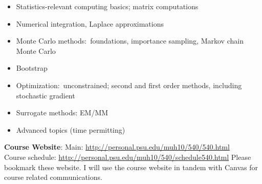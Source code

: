 \documentclass[10pt]{article}
\begin{document}
\begin{itemize}
\item Statistics-relevant computing basics; matrix computations
\item Numerical integration, Laplace approximations 
\item Monte Carlo methods:\ foundations, importance sampling, Markov
  chain Monte Carlo
\item Bootstrap
\item Optimization:\ unconstrained; second and first order methods, including stochastic gradient
\item Surrogate methods: EM/MM %
\item Advanced topics (time permitting) 
\end{itemize}
{\bf Course Website}: Main: \url{http://personal.psu.edu/muh10/540/540.html}\\ Course schedule: \url{http://personal.psu.edu/muh10/540/schedule540.html} Please bookmark these website. I will use the course
website in tandem with Canvas for course related communications. 
\newpage
\end{document}
